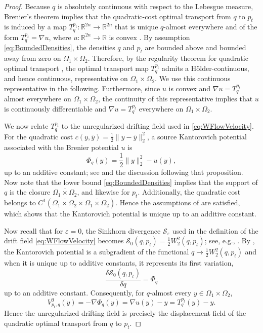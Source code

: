 \documentclass[10pt,a4paper]{amsart}
\newcommand{\R}{\mathbb{R}}
\begin{document}
\begin{proof}
Because $q$ is absolutely continuous with respect to the Lebesgue measure,
Brenier's theorem implies that the quadratic-cost optimal transport from
$q$ to $p_t$ is induced by a map
$T_q^{p_t}:\R^{2n}\to\R^{2n}$ that is unique $q$-almost everywhere and of the form
$T_q^{p_t}=\nabla u$, where $u:\R^{2n}\to\R$ is convex \cite[Theorem~2.26]{Ambrosio2013}. By assumption \eqref{eq:BoundedDensities}, the densities $q$ and $p_t$ are bounded above and bounded away from zero on $\Omega_1 \times \Omega_2$. Therefore, by the regularity theorem for quadratic optimal transport \cite[Theorem~2.27]{Ambrosio2013}, the optimal transport map $T_q^{p_t}$ admits a H\"older-continuous, and hence continuous, representative on $\Omega_1\times\Omega_2$. We use this continuous representative in the following. Furthermore, since $u$ is convex and $\nabla u=T_q^{p_t}$ almost everywhere on $\Omega_1\times\Omega_2$, the continuity of this representative implies that $u$ is continuously differentiable and $\nabla u = T_{q}^{p_t}$ everywhere on $\Omega_1 \times \Omega_2$.




We now relate $T_q^{p_t}$ to the unregularized drifting field used in
\eqref{eq:WFlowVelocity}. For the quadratic cost
$c(y,\bar y)=\frac12\|y-\bar y\|_2^2$, a source Kantorovich potential
associated with the Brenier potential $u$ is
\[
    \Phi_q(y)
    =
    \frac12\|y\|_2^2-u(y),
\]
up to an additive constant; see \cite[Proposition~1.21]{santambrogio2015optimal} and the discussion following that proposition. Now note that 
the lower bound
\eqref{eq:BoundedDensities} implies that the support of $q$ is the closure $\overline{\Omega_1 \times \Omega_2}$, and likewise for $p_t$. Additionally, the quadratic cost belongs
to $C^1(\overline{\Omega_1 \times \Omega_2} \times \overline{\Omega_1 \times \Omega_2})$. Hence the assumptions of
\cite[Proposition~7.18]{santambrogio2015optimal} are satisfied, which shows that the
Kantorovich potential is unique up to an additive constant.



Now recall that for $\varepsilon = 0$, the Sinkhorn divergence $\mathcal{S}_{\varepsilon}$ used in the definition of the drift field \eqref{eq:WFlowVelocity} becomes $\mathcal{S}_0(q, p_t) = \frac{1}{2}W_2^2(q, p_t)$; see, e.g., \cite{han2026wflow}. By \cite[Proposition~7.17]{santambrogio2015optimal}, the Kantorovich potential is a subgradient of the functional $q\mapsto\frac12W_2^2(q,p_t)$ and when it is unique up to additive constants, it represents its first variation, 
\[
\frac{\delta\mathcal S_0(q,p_t)}{\delta q}
=
\Phi_q
\]
up to an additive constant. Consequently, for $q$-almost every
$y\in\Omega_1\times\Omega_2$,
\[
    V_{p_t,q}^0(y)
    =
    -\nabla\Phi_q(y)
    =
    \nabla u(y)-y
    =
    T_q^{p_t}(y)-y.
\]
Hence the unregularized drifting field is precisely the displacement
field of the quadratic optimal transport from $q$ to $p_t$.


\end{proof}
\end{document}
